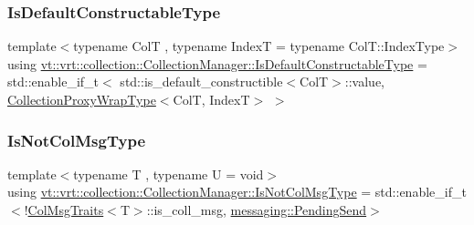 \mbox{\label{structvt_1_1vrt_1_1collection_1_1_collection_manager_af8091fcb8218dad155ea028c9b5d283f}} 
\subsubsection{\texorpdfstring{Is\+Default\+Constructable\+Type}{IsDefaultConstructableType}}
{\footnotesize\ttfamily template$<$typename ColT , typename IndexT  = typename Col\+T\+::\+Index\+Type$>$ \\
using \hyperlink{structvt_1_1vrt_1_1collection_1_1_collection_manager_af8091fcb8218dad155ea028c9b5d283f}{vt\+::vrt\+::collection\+::\+Collection\+Manager\+::\+Is\+Default\+Constructable\+Type} =  std\+::enable\+\_\+if\+\_\+t$<$ std\+::is\+\_\+default\+\_\+constructible$<$ColT$>$\+::value, \hyperlink{structvt_1_1vrt_1_1collection_1_1_collection_manager_a56458ed7f9bb22b631b9b3a745f42f94}{Collection\+Proxy\+Wrap\+Type}$<$ColT, IndexT$>$ $>$}

\mbox{\label{structvt_1_1vrt_1_1collection_1_1_collection_manager_ae376deeefd4f89a0b1c93849977715d9}} 
\subsubsection{\texorpdfstring{Is\+Not\+Col\+Msg\+Type}{IsNotColMsgType}}
{\footnotesize\ttfamily template$<$typename T , typename U  = void$>$ \\
using \hyperlink{structvt_1_1vrt_1_1collection_1_1_collection_manager_ae376deeefd4f89a0b1c93849977715d9}{vt\+::vrt\+::collection\+::\+Collection\+Manager\+::\+Is\+Not\+Col\+Msg\+Type} =  std\+::enable\+\_\+if\+\_\+t$<$!\hyperlink{structvt_1_1vrt_1_1collection_1_1_col_msg_traits}{Col\+Msg\+Traits}$<$T$>$\+::is\+\_\+coll\+\_\+msg, \hyperlink{structvt_1_1messaging_1_1_pending_send}{messaging\+::\+Pending\+Send}$>$}

